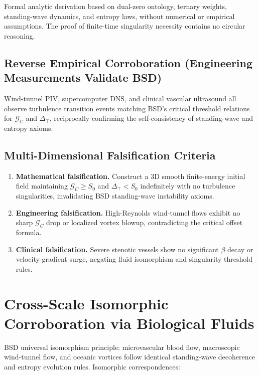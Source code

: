 \documentclass[11pt,a4paper]{article}
\theoremstyle{remark}
\newcommand{\Szero}{S_{0}}
\newcommand{\GC}{\mathcal{G}_{\!C}}
\newcommand{\Dtop}{\Delta_{\!\top}}
\begin{document}
Formal analytic derivation based on dual-zero ontology, ternary weights, standing-wave dynamics, and entropy laws, without numerical or empirical assumptions. The proof of finite-time singularity necessity contains no circular reasoning.

\subsection{Reverse Empirical Corroboration (Engineering Measurements Validate BSD)}

Wind-tunnel PIV, supercomputer DNS, and clinical vascular ultrasound all observe turbulence transition events matching BSD's critical threshold relations for $\GC$ and $\Dtop$, reciprocally confirming the self-consistency of standing-wave and entropy axioms.

\subsection{Multi-Dimensional Falsification Criteria}

\begin{enumerate}
    \item \textbf{Mathematical falsification.} Construct a 3D smooth finite-energy initial field maintaining $\GC\ge\Szero$ and $\Dtop<\Szero$ indefinitely with no turbulence singularities, invalidating BSD standing-wave instability axioms.
    \item \textbf{Engineering falsification.} High-Reynolds wind-tunnel flows exhibit no sharp $\GC$ drop or localized vortex blowup, contradicting the critical offset formula.
    \item \textbf{Clinical falsification.} Severe stenotic vessels show no significant $\beta$ decay or velocity-gradient surge, negating fluid isomorphism and singularity threshold rules.
\end{enumerate}

\section{Cross-Scale Isomorphic Corroboration via Biological Fluids}\label{sec:bio}

BSD universal isomorphism principle: microvascular blood flow, macroscopic wind-tunnel flow, and oceanic vortices follow identical standing-wave decoherence and entropy evolution rules. Isomorphic correspondences:
\end{document}
